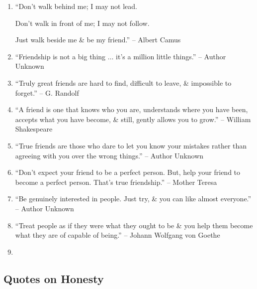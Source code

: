 \documentclass{article}
\begin{document}
\begin{enumerate}
	\item ``Don't walk behind me; I may not lead.
	
	Don't walk in front of me; I may not follow.
	
	Just walk beside me \& be my friend.'' -- Albert Camus
	\item ``Friendship is not a big thing $\ldots$ it's a million little things.'' -- Author Unknown
	\item ``Truly great friends are hard to find, difficult to leave, \& impossible to forget.'' -- G. Randolf
	\item ``A friend is one that knows who you are, understands where you have been, accepts what you have become, \& still, gently allows you to grow.'' -- William Shakespeare
	\item ``True friends are those who dare to let you know your mistakes rather than agreeing with you over the wrong things.'' -- Author Unknown
	\item ``Don't expect your friend to be a perfect person. But, help your friend to become a perfect person. That's true friendship.'' -- Mother Teresa
	\item ``Be genuinely interested in people. Just try, \& you can like almost everyone.'' -- Author Unknown
	\item ``Treat people as if they were what they ought to be \& you help them become what they are of capable of being.'' -- Johann Wolfgang von Goethe
	\item 
\end{enumerate}

\subsection{Quotes on Honesty}
\end{document}
